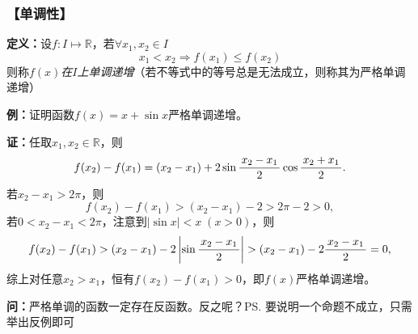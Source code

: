 \subsubsection{【单调性】}

{{\bf 定义：}}设$f:I\mapsto\mathbb{R}$，若$\forall x_1,x_2\in I$
$$x_1<x_2\Rightarrow f(x_1)\leq f(x_2)$$
则称{\it $f(x)$在$I$上单调递增}（若不等式中的等号总是无法成立，则称其为严格单调递增）
	
{\b{\bf 例：}证明函数$f(x)=x+\sin x$严格单调递增。}

{\bf 证：}任取$x_1,x_2\in\mathbb{R}$，则
$$f(x_2)-f(x_1)=(x_2-x_1)+2\sin\displaystyle\frac{\,{x_2-x_1}\,}{\,{2}\,}\cos\displaystyle\frac{\,{x_2+x_1}\,}{\,{2}\,}.$$
若$x_2-x_1>2\pi$，则
$$f(x_2)-f(x_1)>(x_2-x_1)-2>2\pi-2>0,$$
若$0<x_2-x_1<2\pi$，注意到$|\sin x|<x\;(x>0)$，则
$$f(x_2)-f(x_1)>(x_2-x_1)-2\left|\sin\displaystyle\frac{\,{x_2-x_1}\,}{\,{2}\,}\right|
>(x_2-x_1)-2\displaystyle\frac{\,{x_2-x_1}\,}{\,{2}\,}=0,$$
综上对任意$x_2>x_1$，恒有$f(x_2)-f(x_1)>0$，即$f(x)$严格单调递增。

\begin{center}
\end{center}

{\b{\bf 问：}严格单调的函数一定存在反函数。反之呢？}\ps{要说明一个命题不成立，只需举出反例即可}

